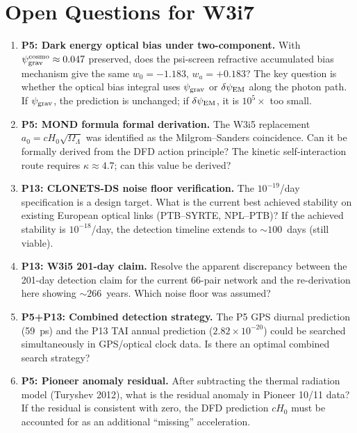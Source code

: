 \documentclass[11pt]{article}
\newcommand{\ee}[1]{\times 10^{#1}}
\newcommand{\psigrav}{\psi_{\rm grav}}
\newcommand{\dpsiEM}{\delta\psi_{\rm EM}}
\newcommand{\Hzero}{H_0}
\newcommand{\aM}{a_0}
\newcommand{\OmL}{\Omega_\Lambda}
\begin{document}
\section{Open Questions for W3i7}
\label{sec:open}

\begin{enumerate}
\item \textbf{P5: Dark energy optical bias under two-component.}
  With $\psigrav^{\rm cosmo} \approx 0.047$ preserved, does the
  psi-screen refractive accumulated bias mechanism give the same
  $w_0 = -1.183$, $w_a = +0.183$? The key question is whether the
  optical bias integral uses $\psigrav$ or $\dpsiEM$ along the
  photon path. If $\psigrav$, the prediction is unchanged; if
  $\dpsiEM$, it is $10^5\times$ too small.

\item \textbf{P5: MOND formula formal derivation.} The W3i5 replacement
  $\aM = c\Hzero\sqrt{\OmL}$ was identified as the Milgrom--Sanders
  coincidence. Can it be formally derived from the DFD action principle?
  The kinetic self-interaction route requires $\kappa \approx 4.7$;
  can this value be derived?

\item \textbf{P13: CLONETS-DS noise floor verification.} The $10^{-19}$/day
  specification is a design target. What is the current best achieved
  stability on existing European optical links (PTB--SYRTE, NPL--PTB)?
  If the achieved stability is $10^{-18}$/day, the detection timeline
  extends to $\sim 100$~days (still viable).

\item \textbf{P13: W3i5 201-day claim.} Resolve the apparent discrepancy
  between the 201-day detection claim for the current 66-pair network
  and the re-derivation here showing $\sim 266$~years. Which noise
  floor was assumed?

\item \textbf{P5+P13: Combined detection strategy.} The P5 GPS diurnal
  prediction (59~ps) and the P13 TAI annual prediction ($2.82\ee{-20}$)
  could be searched simultaneously in GPS/optical clock data. Is there
  an optimal combined search strategy?

\item \textbf{P5: Pioneer anomaly residual.} After subtracting the
  thermal radiation model (Turyshev 2012), what is the residual
  anomaly in Pioneer 10/11 data? If the residual is consistent with
  zero, the DFD prediction $c\Hzero$ must be accounted for as an
  additional ``missing'' acceleration.
\end{enumerate}
\end{document}
